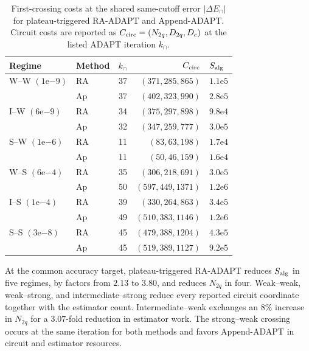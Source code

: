 \documentclass[
  reprint,
  amsmath,
  amssymb,
  aps,
  pra,
  nofootinbib,
  superscriptaddress,
  floatfix
]{revtex4-2}
\begin{document}
\begin{table}[t]
\caption{\label{tab:hh_singleton_matched_plateau}
First-crossing costs at the shared same-cutoff error
\(\lvert\Delta E_\cap\rvert\) for plateau-triggered RA-ADAPT and
Append-ADAPT. Circuit costs are reported as
\(C_{\rm circ}=(N_{2q},D_{2q},D_c)\) at the listed ADAPT iteration
\(k_\cap\).}
\centering
\footnotesize
\setlength{\tabcolsep}{2.2pt}
\renewcommand{\arraystretch}{1.02}
\begin{tabular}{@{}llrrl@{}}
\toprule
Regime & Method & \(k_\cap\) & \(C_{\rm circ}\) & \(S_{\rm alg}\) \\
\midrule
W--W \((1\mathrm{e}{-9})\) & RA & 37 & \((371,285,865)\) & \(1.1\mathrm{e}5\) \\
     & Ap & 37 & \((402,323,990)\) & \(2.8\mathrm{e}5\) \\
\addlinespace[0.25ex]
I--W \((6\mathrm{e}{-9})\) & RA & 34 & \((375,297,898)\) & \(9.8\mathrm{e}4\) \\
     & Ap & 32 & \((347,259,777)\) & \(3.0\mathrm{e}5\) \\
\addlinespace[0.25ex]
S--W \((1\mathrm{e}{-6})\) & RA & 11 & \((83,63,198)\) & \(1.7\mathrm{e}4\) \\
     & Ap & 11 & \((50,46,159)\) & \(1.6\mathrm{e}4\) \\
\addlinespace[0.25ex]
W--S \((6\mathrm{e}{-4})\) & RA & 35 & \((306,218,691)\) & \(3.0\mathrm{e}5\) \\
     & Ap & 50 & \((597,449,1371)\) & \(1.2\mathrm{e}6\) \\
\addlinespace[0.25ex]
I--S \((1\mathrm{e}{-4})\) & RA & 39 & \((330,264,863)\) & \(3.4\mathrm{e}5\) \\
     & Ap & 49 & \((510,383,1146)\) & \(1.2\mathrm{e}6\) \\
\addlinespace[0.25ex]
S--S \((3\mathrm{e}{-8})\) & RA & 45 & \((479,388,1204)\) & \(4.3\mathrm{e}5\) \\
     & Ap & 45 & \((519,389,1127)\) & \(9.2\mathrm{e}5\) \\
\bottomrule
\end{tabular}
\end{table}

At the common accuracy target, plateau-triggered RA-ADAPT reduces
\(S_{\rm alg}\) in five regimes, by factors from \(2.13\) to \(3.80\), and
reduces \(N_{2q}\) in four. Weak--weak, weak--strong, and
intermediate--strong reduce every reported circuit coordinate together with
the estimator count. Intermediate--weak exchanges an \(8\%\) increase in
\(N_{2q}\) for a \(3.07\)-fold reduction in estimator work. The
strong--weak crossing occurs at the same iteration for both methods and favors
Append-ADAPT in circuit and estimator resources.
\end{document}
